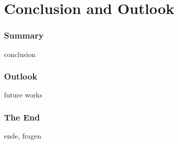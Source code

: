 \section{Conclusion and Outlook}
\frame{\tableofcontents[currentsection]}
		\begin{frame}
			\frametitle{Summary}
			conclusion
		\end{frame}
		\begin{frame}
			\frametitle{Outlook}
			future works
		\end{frame}
		
		\begin{frame}
			\frametitle{The End}
			ende, fragen
		\end{frame}
	